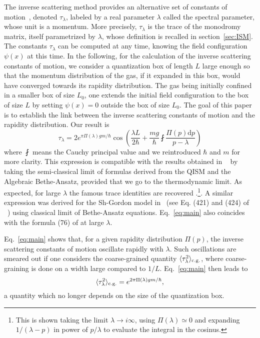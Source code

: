 \documentclass[submission,Phys,10pt]{SciPost}%
\begin{document}
The inverse scattering method provides an alternative
set of constants of motion~\cite{korepin_quantum_1993},  denoted $\tau_\lambda$,
labeled by a real parameter $\lambda$ called the spectral parameter,  whose unit is a momentum. More  precisely,  $\tau_\lambda$ is the trace of the monodromy matrix,
itself parametrized by $\lambda$, whose 
definition is recalled in section~\ref{sec:ISM}.
The constants $\tau_\lambda$ can be computed at any time, knowing the field configuration $\psi(x)$ at this time. 
In the following, for the calculation of the inverse scattering constants of motion, we 
consider a quantization  box of length  $L$ large enough so that the momentum distribution of the gas, if it expanded in this box, would have
 converged towards its rapidity distribution. The gas being initially confined in a smaller box of size $L_0$, 
one extends the initial field configuration to the box of size $L$ by setting $\psi(x)=0$ outside the box of size $L_0$. 
The goal of this paper is to establish the link between the inverse scattering constants of motion and the rapidity distribution.  Our result
 is 
 \begin{equation}
 \label{eq:main}
 \tau_\lambda = 2e^{\pi  \Pi(\lambda)gm/\hbar}\cos\left ( \frac{\lambda L}{2\hbar}+\frac{m g}{\hbar}\fint \frac{\Pi(p)\mathrm{d}p}{p-\lambda}\right )
 \end{equation}
 where $\fint$ means the Cauchy principal value and we reintroduced $\hbar$ and $m$ for more clarity. 
This expression is compatible with the results obtained in ~\cite{bettelheim_whitham_2020} by 
taking the semi-classical limit of formulas derived from the QISM and the Algebraic Bethe-Ansatz, 
 provided that we go to the thermodynamic limit. 
As expected, for large $\lambda$ the famous trace identities are recovered %
\cite{korepin_quantum_1993}.\footnote{This is shown taking  the limit  $\lambda\rightarrow i\infty$, using $\Pi(\lambda)\simeq 0$ and expanding $1/(\lambda -p)$ in power of $p/\lambda$ to evaluate the integral in the cosinus. }. A similar  expression was derived for the Sh-Gordon model in~\cite{luca_equilibration_2016} (see Eq. (421) and (424) of ~\cite{luca_equilibration_2016}) using classical
limit of Bethe-Ansatz equations.  Eq.~\eqref{eq:main} also coincides with 
the formula (76) of \cite{del_vecchio_del_vecchio_exact_2020} at large $\lambda$. 


Eq.~\eqref{eq:main} shows that, for a given rapidity distribution $\Pi(p)$, the inverse scattering constants of motion oscillate rapidly with $\lambda$.  Such oscillations 
are smeared out if one considers the coarse-grained 
quantity $\langle \tau_\lambda^2\rangle_{\rm{c.g.}}$, where coarse-graining is done on a width  large compared to $1/L$.
Eq.~\eqref{eq:main} then leads to $$\langle \tau_\lambda^2\rangle_{\rm{c.g.}}=e^{2\pi\Pi(\lambda)gm/\hbar},$$
a quantity which no longer depends on the size of the 
quantization box. 
\end{document}
